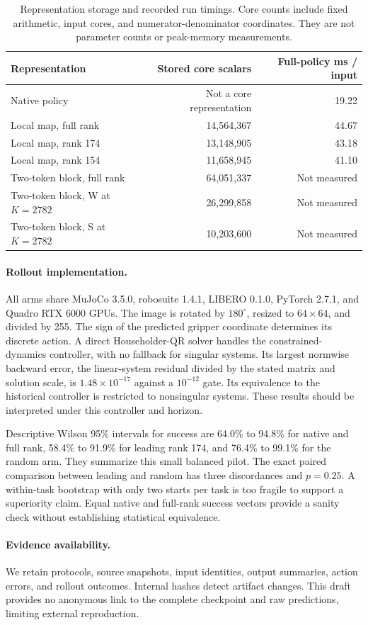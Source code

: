 \documentclass{article}
\begin{document}
\begin{table}[ht]
\centering\small\setlength{\tabcolsep}{8pt}
\begin{tabular}{@{}lrr@{}}
\toprule
Representation & Stored core scalars & Full-policy ms / input\\
\midrule
Native policy & Not a core representation & 19.22\\
Local map, full rank & 14,564,367 & 44.67\\
Local map, rank 174 & 13,148,905 & 43.18\\
Local map, rank 154 & 11,658,945 & 41.10\\
Two-token block, full rank & 64,051,337 & Not measured\\
Two-token block, W at $K=2782$ & 26,299,858 & Not measured\\
Two-token block, S at $K=2782$ & 10,203,600 & Not measured\\
\bottomrule
\end{tabular}
\caption{Representation storage and recorded run timings. Core counts include fixed arithmetic, input cores, and numerator-denominator coordinates. They are not parameter counts or peak-memory measurements.}
\label{tab.storage}
\end{table}

\paragraph{Rollout implementation.}
All arms share MuJoCo 3.5.0, robosuite 1.4.1, LIBERO 0.1.0, PyTorch 2.7.1, and Quadro RTX 6000 GPUs. The image is rotated by $180^\circ$, resized to $64\times64$, and divided by 255. The sign of the predicted gripper coordinate determines its discrete action. A direct Householder-QR solver handles the constrained-dynamics controller, with no fallback for singular systems. Its largest normwise backward error, the linear-system residual divided by the stated matrix and solution scale, is $1.48\times10^{-17}$ against a $10^{-12}$ gate. Its equivalence to the historical controller is restricted to nonsingular systems. These results should be interpreted under this controller and horizon.

Descriptive Wilson 95\% intervals for success are 64.0\% to 94.8\% for native and full rank, 58.4\% to 91.9\% for leading rank 174, and 76.4\% to 99.1\% for the random arm. They summarize this small balanced pilot. The exact paired comparison between leading and random has three discordances and $p=0.25$. A within-task bootstrap with only two starts per task is too fragile to support a superiority claim. Equal native and full-rank success vectors provide a sanity check without establishing statistical equivalence.

\paragraph{Evidence availability.}
We retain protocols, source snapshots, input identities, output summaries, action errors, and rollout outcomes. Internal hashes detect artifact changes. This draft provides no anonymous link to the complete checkpoint and raw predictions, limiting external reproduction.
\end{document}
